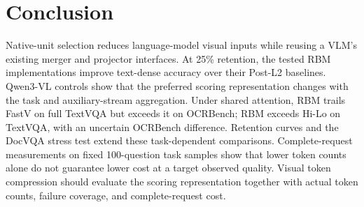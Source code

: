 \documentclass[10pt,twocolumn,letterpaper]{article}
\begin{document}
\FloatBarrier
\section{Conclusion}
Native-unit selection reduces language-model visual inputs while reusing a VLM's existing merger and projector interfaces. At 25\% retention, the tested RBM implementations improve text-dense accuracy over their Post-L2 baselines. Qwen3-VL controls show that the preferred scoring representation changes with the task and auxiliary-stream aggregation. Under shared attention, RBM trails FastV on full TextVQA but exceeds it on OCRBench; RBM exceeds Hi-Lo on TextVQA, with an uncertain OCRBench difference. Retention curves and the DocVQA stress test extend these task-dependent comparisons. Complete-request measurements on fixed 100-question task samples show that lower token counts alone do not guarantee lower cost at a target observed quality. Visual token compression should evaluate the scoring representation together with actual token counts, failure coverage, and complete-request cost.

\FloatBarrier
{\small


}
\end{document}
